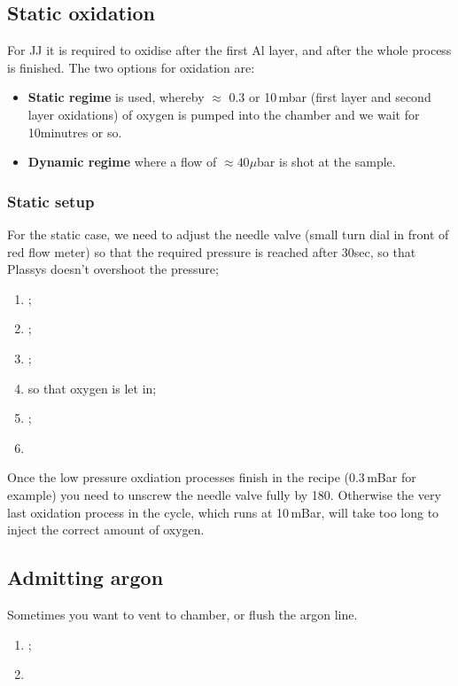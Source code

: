   \subsection{Static oxidation}
   For JJ it is required to oxidise after the first Al layer, and after the whole process is finished. The two options for oxidation are:
    \begin{itemize}
   	\item \textbf{Static regime} is used, whereby $ \approx $ 0.3 or 10\,mbar (first layer and second layer oxidations) of oxygen is pumped into the chamber and we wait for 10minutres or so. 
   	\item \textbf{Dynamic regime} where a flow of $ \approx 40\mu$bar is shot at the sample.
   \end{itemize}

	\subsubsection{Static setup}
	For the static case, we need to adjust the needle valve (small turn dial in front of red flow meter) so that the required pressure is reached after 30sec, so that Plassys doesn't overshoot the pressure;
	\begin{enumerate}
		\item {};
		\item {};
		\item {};
		\item {} so that oxygen is let in;
		\item {};
		\item {}
	\end{enumerate}
	{\LARGE
		Once the low pressure oxdiation processes finish in the recipe (0.3\,mBar for example) you need to unscrew the needle valve fully by 180\ideg. Otherwise the very last oxidation process in the cycle, which runs at 10\,mBar, will take too long to inject the correct amount of oxygen.
	}

 \subsection{Admitting argon}
  Sometimes you want to vent to chamber, or flush the argon line.
  \begin{enumerate}
  	\item {};
  	\item {}
        \end{enumerate}
 \newpage
